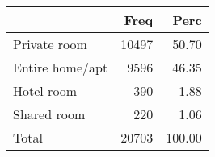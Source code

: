 
\begin{tabular}[t]{lrr}
\toprule
  & Freq & Perc\\
\midrule
Private room & 10497 & 50.70\\
Entire home/apt & 9596 & 46.35\\
Hotel room & 390 & 1.88\\
Shared room & 220 & 1.06\\
Total & 20703 & 100.00\\
\bottomrule
\end{tabular}
